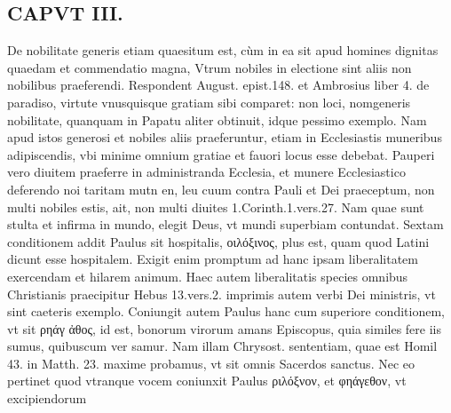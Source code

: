 \documentclass{article}
\begin{document}
\begin{pages}
\section*{CAPVT  III. }
\marginpar{[ p.125 ]}\pstart De nobilitate generis etiam quaesitum est, cùm in ea sit apud homines dignitas quaedam et commendatio magna, Vtrum nobiles in electione sint aliis non nobilibus praeferendi. Respondent August. epist.148. et Ambrosius liber 4. de paradiso, virtute vnusquisque gratiam sibi comparet: non loci, nomgeneris nobilitate, quanquam in Papatu aliter obtinuit, idque  pessimo exemplo. Nam apud istos generosi et nobiles aliis praeferuntur, etiam in Ecclesiastis muneribus adipiscendis, vbi minime omnium gratiae et fauori locus esse debebat.  \pend\pstart Pauperi vero diuitem praeferre in administranda Ecclesia, et munere Ecclesiastico deferendo noi taritam mutn en, leu cuum contra Pauli et Dei praeceptum, non multi nobiles estis, ait, non multi diuites 1.Corinth.1.vers.27. Nam quae sunt stulta et infirma in mundo, elegit Deus, vt mundi superbiam contundat.  \pend\pstart Sextam conditionem addit Paulus sit hospitalis, οιλόξινος, plus est, quam quod Latini dicunt esse hospitalem. Exigit enim promptum ad hanc ipsam liberalitatem exercendam et hilarem animum. Haec autem liberalitatis species omnibus Christianis praecipitur Hebus 13.vers.2. imprimis autem verbi Dei ministris, vt sint caeteris exemplo. Coniungit autem Paulus hanc cum superiore conditionem, vt sit ρηάγ ἀθος, id est, bonorum virorum amans Episcopus, quia similes fere iis sumus, quibuscum ver samur. Nam illam Chrysost. sententiam, quae est Homil 43. in Matth. 23. maxime probamus, vt sit omnis Sacerdos sanctus. Nec eo pertinet quod vtranque vocem coniunxit Paulus ριλόξνον, et φηάγεθον, vt excipiendorum  \pend

\end{pages}
\end{document}
